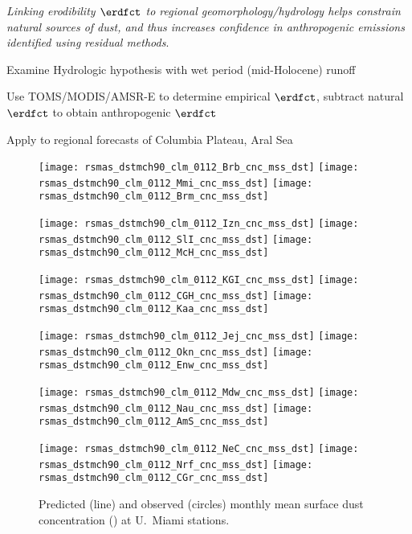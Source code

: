 \documentclass[final,dvips]{foils}
\begin{document}
\rotatefoilhead{\bgl
\Large\textcolor{blue}{\hfill Future Work \hfill}}\vspace{-0.5in}\large
\textit{Linking erodibility $\erdfct$ to regional
  geomorphology/hydrology helps constrain natural sources of dust, and
  thus increases confidence in anthropogenic emissions identified using residual methods}.
\begin{itemize*}
\item Examine Hydrologic hypothesis with wet period (mid-Holocene) runoff
\item Use TOMS/MODIS/AMSR-E to determine empirical $\erdfct$, subtract
  natural $\erdfct$ to obtain anthropogenic $\erdfct$ 
\item Apply to regional forecasts of Columbia Plateau, Aral Sea
\end{itemize*}

\foilhead{\vspace{0.25in}\Large\textcolor{blue}{\hfill
Performance with Area $\erdfct$ \hfill}}\vspace{-0.5in}
\begin{figure*}
\centering %
\texttt{[image: rsmas\_dstmch90\_clm\_0112\_Brb\_cnc\_mss\_dst]}%
\texttt{[image: rsmas\_dstmch90\_clm\_0112\_Mmi\_cnc\_mss\_dst]}%
\texttt{[image: rsmas\_dstmch90\_clm\_0112\_Brm\_cnc\_mss\_dst]}%

\texttt{[image: rsmas\_dstmch90\_clm\_0112\_Izn\_cnc\_mss\_dst]}%
\texttt{[image: rsmas\_dstmch90\_clm\_0112\_SlI\_cnc\_mss\_dst]}%
\texttt{[image: rsmas\_dstmch90\_clm\_0112\_McH\_cnc\_mss\_dst]}%

\texttt{[image: rsmas\_dstmch90\_clm\_0112\_KGI\_cnc\_mss\_dst]}%
\texttt{[image: rsmas\_dstmch90\_clm\_0112\_CGH\_cnc\_mss\_dst]}%
\texttt{[image: rsmas\_dstmch90\_clm\_0112\_Kaa\_cnc\_mss\_dst]}%

\texttt{[image: rsmas\_dstmch90\_clm\_0112\_Jej\_cnc\_mss\_dst]}%
\texttt{[image: rsmas\_dstmch90\_clm\_0112\_Okn\_cnc\_mss\_dst]}%
\texttt{[image: rsmas\_dstmch90\_clm\_0112\_Enw\_cnc\_mss\_dst]}%

\texttt{[image: rsmas\_dstmch90\_clm\_0112\_Mdw\_cnc\_mss\_dst]}%
\texttt{[image: rsmas\_dstmch90\_clm\_0112\_Nau\_cnc\_mss\_dst]}%
\texttt{[image: rsmas\_dstmch90\_clm\_0112\_AmS\_cnc\_mss\_dst]}%

\texttt{[image: rsmas\_dstmch90\_clm\_0112\_NeC\_cnc\_mss\_dst]}%
\texttt{[image: rsmas\_dstmch90\_clm\_0112\_Nrf\_cnc\_mss\_dst]}%
\texttt{[image: rsmas\_dstmch90\_clm\_0112\_CGr\_cnc\_mss\_dst]}%
\caption{
Predicted (line) and observed (circles) monthly mean surface
dust concentration (\ugxmC) at U.~Miami stations.
\label{fgr:rsmas}}
\end{figure*}
\end{document}
